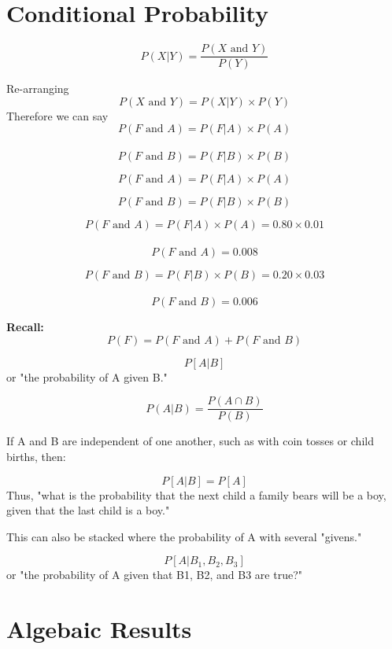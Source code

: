 \documentclass[]{report}
\begin{document}
\section{Conditional Probability}

\[ P(X|Y)  = \frac{P(X \mbox{ and } Y)}{P(Y)} \]

Re-arranging
\[ P(X \mbox{ and } Y) =  P(X|Y)\times P(Y) \]
Therefore we can say
\[ P(F \mbox{ and } A) =  P(F|A)\times P(A) \]\\
\[ P(F \mbox{ and } B) =  P(F|B)\times P(B) \]





\[ P(F \mbox{ and } A) =  P(F|A)\times P(A) \]

\[ P(F \mbox{ and } B) =  P(F|B)\times P(B) \]




\[ P(F \mbox{ and } A) =  P(F|A)\times P(A) = 0.80 \times 0.01\]\\
\[ P(F \mbox{ and } A) = 0.008\]

\[ P(F \mbox{ and } B) =  P(F|B)\times P(B) = 0.20 \times 0.03\]\\
\[ P(F \mbox{ and } B) = 0.006\]

\textbf{Recall:}
\[ P(F) = P(F \mbox{ and } A) + P(F \mbox{ and } B) \]








\[P[A | B]\]
or "the probability of A given B."

\[P(A | B) = \frac{P(A\cap B)}{P(B)}\]

If A and B are independent of one another, such as with coin tosses or child births, then:


\[P[A | B] = P[ A ]\]
Thus, "what is the probability that the next child a family bears will be a boy, given that the last child is a boy."

This can also be stacked where the probability of A with several "givens."


\[P[A | B_1, B_2, B_3 ]\]
or "the probability of A given that B1, B2, and B3 are true?"



\section{Algebaic Results}
\end{document}
